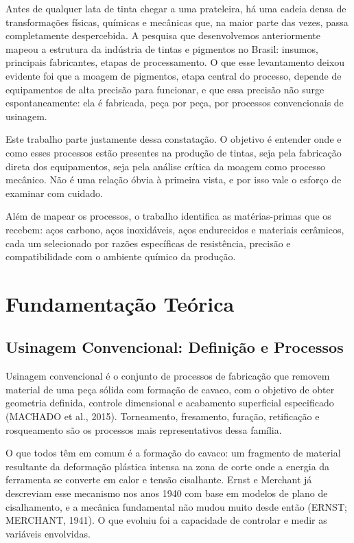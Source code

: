 \documentclass[
  12pt,
  a4paper,
  oneside,
  brazil,
  chapter=TITLE
]{article}
\newcommand{\secbreak}{\clearpage}
\let\oldsection\section
\renewcommand{\section}{\secbreak\oldsection}
\begin{document}
Antes de qualquer lata de tinta chegar a uma prateleira, há uma cadeia densa
de transformações físicas, químicas e mecânicas que, na maior parte das vezes,
passa completamente despercebida. A pesquisa que desenvolvemos anteriormente
mapeou a estrutura da indústria de tintas e pigmentos no Brasil: insumos,
principais fabricantes, etapas de processamento. O que esse levantamento
deixou evidente foi que a moagem de pigmentos, etapa central do processo,
depende de equipamentos de alta precisão para funcionar, e que essa precisão
não surge espontaneamente: ela é fabricada, peça por peça, por processos
convencionais de usinagem.

Este trabalho parte justamente dessa constatação. O objetivo é entender onde e
como esses processos estão presentes na produção de tintas, seja pela
fabricação direta dos equipamentos, seja pela análise crítica da moagem como
processo mecânico. Não é uma relação óbvia à primeira vista, e por isso vale o
esforço de examinar com cuidado.

Além de mapear os processos, o trabalho identifica as matérias-primas que os
recebem: aços carbono, aços inoxidáveis, aços endurecidos e materiais
cerâmicos, cada um selecionado por razões específicas de resistência, precisão
e compatibilidade com o ambiente químico da produção.

\section{Fundamentação Teórica}

\subsection{Usinagem Convencional: Definição e Processos}

Usinagem convencional é o conjunto de processos de fabricação que removem
material de uma peça sólida com formação de cavaco, com o objetivo de obter
geometria definida, controle dimensional e acabamento superficial especificado
(MACHADO et al., 2015). Torneamento, fresamento, furação, retificação e
rosqueamento são os processos mais representativos dessa família.

O que todos têm em comum é a formação do cavaco: um fragmento de material
resultante da deformação plástica intensa na zona de corte onde a energia da
ferramenta se converte em calor e tensão cisalhante. Ernst e Merchant já
descreviam esse mecanismo nos anos 1940 com base em modelos de plano de
cisalhamento, e a mecânica fundamental não mudou muito desde então
(ERNST; MERCHANT, 1941). O que evoluiu foi a capacidade de controlar e medir as
variáveis envolvidas.
\end{document}
